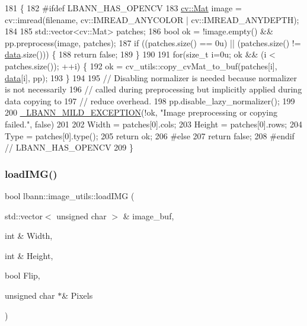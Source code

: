 \begin{DoxyCode}
181                                                                                                            
                 \{
182 \textcolor{preprocessor}{#ifdef LBANN\_HAS\_OPENCV}
183   \hyperlink{base_8hpp_a68f11fdc31b62516cb310831bbe54d73}{cv::Mat} image = cv::imread(filename, cv::IMREAD\_ANYCOLOR | cv::IMREAD\_ANYDEPTH);
184 
185   std::vector<cv::Mat> patches;
186   \textcolor{keywordtype}{bool} ok = !image.empty() && pp.preprocess(image, patches);
187   \textcolor{keywordflow}{if} ((patches.size() == 0u) || (patches.size() != \hyperlink{namespacelbann_1_1cnpy__utils_a9ac86d96ccb1f8b4b2ea16441738781f}{data}.size())) \{
188     \textcolor{keywordflow}{return} \textcolor{keyword}{false};
189   \}
190 
191   \textcolor{keywordflow}{for}(\textcolor{keywordtype}{size\_t} i=0u; ok && (i < patches.size()); ++i) \{
192     ok = cv\_utils::copy\_cvMat\_to\_buf(patches[i], \hyperlink{namespacelbann_1_1cnpy__utils_a9ac86d96ccb1f8b4b2ea16441738781f}{data}[i], pp);
193   \}
194 
195   \textcolor{comment}{// Disabling normalizer is needed because normalizer is not necessarily}
196   \textcolor{comment}{// called during preprocessing but implicitly applied during data copying to}
197   \textcolor{comment}{// reduce overhead.}
198   pp.disable\_lazy\_normalizer();
199 
200   \hyperlink{mild__exception_8hpp_a7b8339c566152ab29ce66b63e90c67f9}{\_LBANN\_MILD\_EXCEPTION}(!ok, \textcolor{stringliteral}{"Image preprocessing or copying failed."}, \textcolor{keyword}{false})
201 
202   Width  = patches[0].cols;
203   Height = patches[0].rows;
204   Type   = patches[0].type();
205   return ok;
206 \textcolor{preprocessor}{#else}
207   \textcolor{keywordflow}{return} \textcolor{keyword}{false};
208 \textcolor{preprocessor}{#endif // LBANN\_HAS\_OPENCV}
209 \}
\end{DoxyCode}
\mbox{\label{classlbann_1_1image__utils_a6043097a96cf246ac1b63053ed15962b}} 
\subsubsection{\texorpdfstring{load\+I\+M\+G()}{loadIMG()}\hspace{0.1cm}{\footnotesize\ttfamily [1/2]}}
{\footnotesize\ttfamily bool lbann\+::image\+\_\+utils\+::load\+I\+MG (\begin{DoxyParamCaption}\item[{std\+::vector$<$ unsigned char $>$ \&}]{image\+\_\+buf,  }\item[{int \&}]{Width,  }\item[{int \&}]{Height,  }\item[{bool}]{Flip,  }\item[{unsigned char $\ast$\&}]{Pixels }\end{DoxyParamCaption})\hspace{0.3cm}{\ttfamily [static]}}



